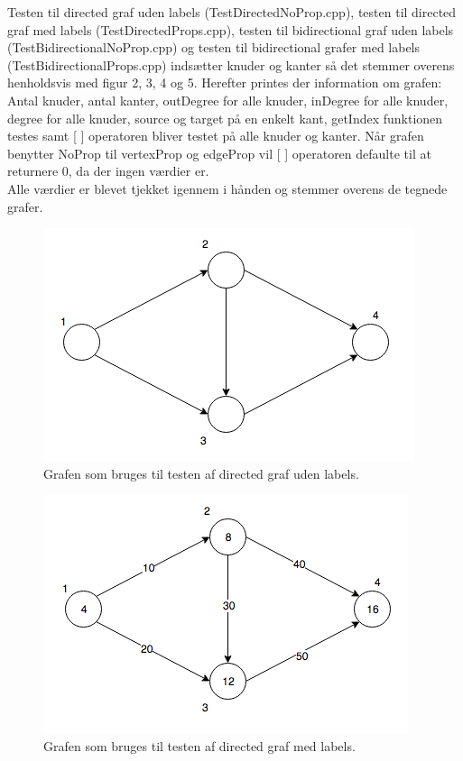 \documentclass[a4paper,10pt,titlepage]{article}
\begin{document}
Testen til directed graf uden labels (TestDirectedNoProp.cpp), testen til directed graf med labels (TestDirectedProps.cpp), testen til bidirectional graf uden labels (TestBidirectionalNoProp.cpp) og testen til bidirectional grafer med labels (TestBidirectionalProps.cpp) indsætter knuder og kanter så det stemmer overens henholdsvis med figur 2, 3, 4 og 5. Herefter printes der information om grafen: Antal knuder, antal kanter, outDegree for alle knuder, inDegree for alle knuder, degree for alle knuder, source og target på en enkelt kant, getIndex funktionen testes samt [ ] operatoren bliver testet på alle knuder og kanter. Når grafen benytter NoProp til vertexProp og edgeProp vil [ ] operatoren defaulte til at returnere 0, da der ingen værdier er.\\
Alle værdier er blevet tjekket igennem i hånden og stemmer overens de tegnede grafer.

\begin{figure}[H]
\centering
\includegraphics[scale=0.5]{Billeder/GraphDirectedNoProp.png}
\caption{Grafen som bruges til testen af directed graf uden labels.}
\end{figure}
\begin{figure}[H]
\centering
\includegraphics[scale=0.5]{Billeder/GraphDirectedProps.png}
\caption{Grafen som bruges til testen af directed graf med labels.}
\end{figure}
\end{document}
